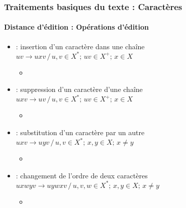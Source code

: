 \documentclass[xcolor=table]{beamer}
\begin{document}
\begin{frame}
\frametitle{Traitements basiques du texte : Caractères}
\framesubtitle{Distance d'édition : Opérations d'édition}

\begin{itemize}
	\item {} : insertion d'un caractère dans une chaîne\\
	$uv \rightarrow uxv \,/\, u, v \in X^*;\, uv \in X^+;\, x \in X$
	\begin{itemize}
		\item {}
	\end{itemize}
	
	\item {} : suppression d'un caractère d'une chaîne\\
	$uxv \rightarrow uv \,/\, u, v \in X^*;\, uv \in X^+;\, x \in X$
	\begin{itemize}
		\item {}
	\end{itemize}
	
	\item {} : substitution d'un caractère par un autre\\
	$uxv \rightarrow uyv \,/\, u, v \in X^*;\, x, y \in X;\, x \ne y$
	\begin{itemize}
		\item {}
	\end{itemize}
	
	\item {} : changement de l'ordre de deux caractères\\
	$uxwyv \rightarrow uywxv \,/\, u, v, w \in X^*;\, x, y \in X;\, x \ne y$
	\begin{itemize}
		\item {}
	\end{itemize}
\end{itemize}

\end{frame}
\end{document}
